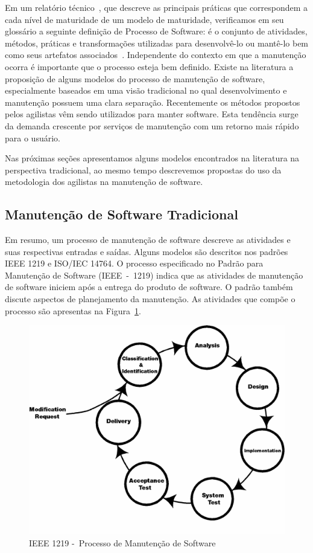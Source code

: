 Em um relatório técnico~\cite{paulk1993key}, que descreve as principais práticas
que correspondem a cada nível de maturidade de um modelo de maturidade,
verificamos em seu glossário a seguinte definição de Processo de Software: é o
conjunto de atividades, métodos, práticas e transformações utilizadas para
desenvolvê-lo ou mantê-lo bem como seus artefatos
associados~\cite{paulk1993key}. Independente do contexto em que a manutenção
ocorra é importante que o processo esteja bem definido. Existe na literatura a
proposição de alguns modelos do processo de manutenção de software,
especialmente baseados em uma visão tradicional no qual desenvolvimento e
manutenção possuem uma clara separação. Recentemente os métodos propostos pelos
agilistas vêm sendo utilizados para manter software.  Esta tendência surge da
demanda crescente por serviços de manutenção com um retorno mais rápido para o
usuário.
\todoend

Nas próximas seções apresentamos alguns modelos encontrados na literatura na
perspectiva tradicional, ao mesmo tempo descrevemos propostas do uso da
metodologia dos agilistas na manutenção de software.

\subsection{Manutenção de Software Tradicional}
\label{subsec:manutenção_de_software_tradicional}

Em resumo, um processo de manutenção de software descreve as atividades e suas
respectivas entradas e saídas. Alguns modelos são descritos nos padrões IEEE
1219 e ISO/IEC 14764. O processo especificado no Padrão para Manutenção de
Software (IEEE~-~1219) indica que as atividades de manutenção de software iniciem
após a entrega do produto de software. O padrão também discute aspectos de
planejamento da manutenção. As atividades que compõe o processo são apresentas
na Figura~\ref{fig:ieee-1219-processo-man-software}.

\begin{figure}[htpb] \centering
	\includegraphics[width=0.7\linewidth]
	{chapter-manutencao-software-visao-geral/img/ieee-1219-98-processo-manutencao.png}
	\caption{IEEE 1219 -~Processo de Manutenção de Software}\label{fig:ieee-1219-processo-man-software}
\end{figure}

